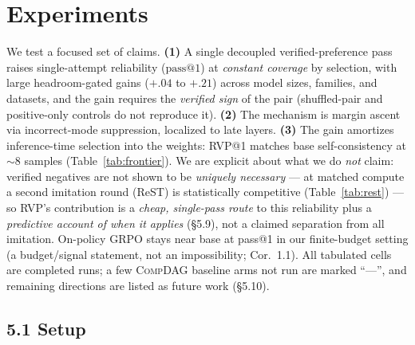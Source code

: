 \section*{Experiments}

We test a focused set of claims. \textbf{(1)} A single decoupled verified-preference
pass raises single-attempt reliability ($\text{pass}@1$) at \emph{constant coverage}
by selection, with large headroom-gated gains ($+.04$ to $+.21$) across model sizes,
families, and datasets, and the gain requires the \emph{verified sign} of the pair
(shuffled-pair and positive-only controls do not reproduce it). \textbf{(2)} The
mechanism is margin ascent via incorrect-mode suppression, localized to late layers.
\textbf{(3)} The gain amortizes inference-time selection into the weights: RVP@1
matches base self-consistency at $\sim\!8$ samples (Table~\ref{tab:frontier}). We are
explicit about what we do \emph{not} claim: verified negatives are not shown to be
\emph{uniquely necessary} --- at matched compute a second imitation round (ReST) is
statistically competitive (Table~\ref{tab:rest}) --- so RVP's contribution is a
\emph{cheap, single-pass route} to this reliability plus a \emph{predictive account
of when it applies} (\S5.9), not a claimed separation from all imitation. On-policy
GRPO stays near base at pass@1 in our finite-budget setting (a budget/signal
statement, not an impossibility; Cor.~1.1). All tabulated cells are completed runs; a few
\textsc{CompDAG} baseline arms not run are marked ``---'', and remaining directions are listed as future
work (\S5.10).

\subsection*{5.1 Setup}

